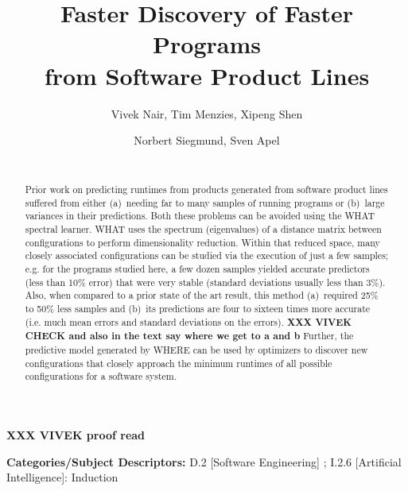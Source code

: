 \documentclass{sig-alternative}
\begin{document}
\title{Faster Discovery  of Faster Programs \\from Software Product Lines} 
\author{
        \alignauthor Vivek Nair, Tim Menzies, Xipeng Shen 
    \and  
        \alignauthor Norbert Siegmund, Sven Apel \\
        \\
       }

\maketitle 
\thispagestyle{plain}
\pagestyle{plain}
{\bf XXX VIVEK proof read} 
\begin{abstract}
Prior work on predicting runtimes from products generated from
software product lines suffered from either (a)~needing far to many samples
of running programs or (b)~large variances in their predictions.
Both these problems can be avoided using the WHAT
spectral learner. 
WHAT  uses the spectrum (eigenvalues) of a distance matrix
between configurations to perform dimensionality reduction. Within that
reduced space, many closely associated configurations can be studied
via the execution of just a few samples; e.g. for the programs studied
here, a few dozen samples yielded accurate predictors (less than 10\% error)
that were very stable (standard deviations usually less than 3\%).  
Also, when compared to a prior state of the art result, this method (a)~required  
25\% to 50\% less samples 
and (b)~its predictions are   four to sixteen times more accurate (i.e. much mean errors
and 
standard deviations on the errors). 
{\bf XXX VIVEK CHECK and also in  the text say where we get to a and b}  
Further, the predictive model generated by
WHERE can be used by optimizers to discover new configurations that closely
approach the minimum runtimes of all possible configurations for a software system.
\end{abstract}

\vspace{1mm}
\noindent
{\bf Categories/Subject Descriptors:} 
D.2 [Software Engineering] ;
I.2.6 [Artificial Intelligence]: Induction

 
\vspace{1mm}
\noindent
\end{document}
